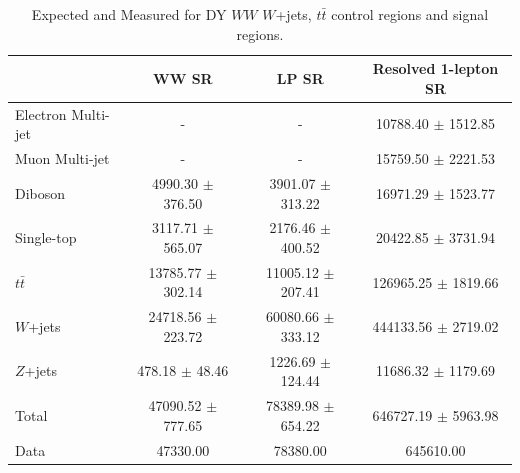\begin{table}
\begin{tabular}{|l|c|c|c|}
\hline
	  &	 WW SR &	 LP SR &	Resolved 1-lepton SR \\\hline 
	Electron Multi-jet &	- &	- &	10788.40 $\pm$ 1512.85 \\\hline 
	Muon Multi-jet &	- &	- &	15759.50 $\pm$ 2221.53 \\\hline 
	Diboson &	4990.30 $\pm$ 376.50 &	3901.07 $\pm$ 313.22 &	16971.29 $\pm$ 1523.77 \\\hline 
	Single-top &	3117.71 $\pm$ 565.07 &	2176.46 $\pm$ 400.52 &	20422.85 $\pm$ 3731.94 \\\hline 
	$t\bar{t}$ &	13785.77 $\pm$ 302.14 &	11005.12 $\pm$ 207.41 &	126965.25 $\pm$ 1819.66 \\\hline 
	$W$+jets &	24718.56 $\pm$ 223.72 &	60080.66 $\pm$ 333.12 &	444133.56 $\pm$ 2719.02 \\\hline 
	$Z$+jets &	478.18 $\pm$ 48.46 &	1226.69 $\pm$ 124.44 &	11686.32 $\pm$ 1179.69 \\\hline 
	Total &	47090.52 $\pm$ 777.65 &	78389.98 $\pm$ 654.22 &	646727.19 $\pm$ 5963.98 \\\hline 
	Data &	47330.00 &	78380.00 &	645610.00 \\\hline 
\end{tabular}
\caption{Expected and Measured for DY $WW$ $W$+jets, $t\bar{t}$ control regions and signal regions.}
\label{tbl:hvtww_yields_tcr}
\end{table}

